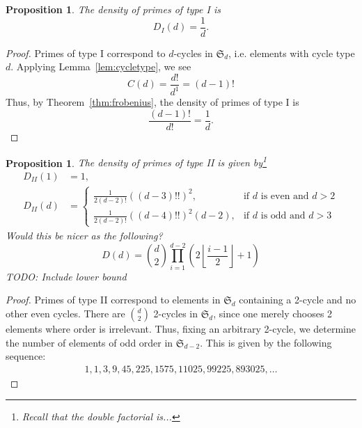 \documentclass[11pt]{article}
\theoremstyle{plain}
\newtheorem{proposition}[theorem]{Proposition}
\theoremstyle{definition}
\theoremstyle{remark}
\numberwithin{equation}{section}
\numberwithin{table}{section}
\renewcommand{\SS}{\mathfrak{S}}
\begin{document}
\begin{proposition}\label{prop:type1}
  The density of primes of type I is 
  \begin{equation*}
    D_I(d)=\frac{1}{d}.
  \end{equation*}
\end{proposition}
\begin{proof}
  Primes of type I correspond to $d$-cycles in $\SS_d$, i.e. elements with 
  cycle type $d$. Applying Lemma~\ref{lem:cycletype}, we see
  \begin{equation*}
    C(d)=\frac{d!}{d^1}=(d-1)!
  \end{equation*}
  Thus, by Theorem~\ref{thm:frobenius}, the density of primes of type I is
  \begin{equation*}
    \frac{(d-1)!}{d!}=\frac{1}{d}.
  \end{equation*}
\end{proof}

\begin{proposition}\label{prop:type2}
  The density of primes of type II is given by\footnote{Recall that the \emph{double factorial} is...}
  \begin{align*}
    D_{II}(1)&=1,\\
    D_{II}(d)&=\begin{cases}
        \frac{1}{2(d-2)!}\left((d-3)!!\right)^2,&\text{if }d\text{ is even and }d>2\\
        \frac{1}{2(d-2)!}\left((d-4)!!\right)^2(d-2),&\text{if }d\text{ is odd and }d>3
    \end{cases}
  \end{align*}
  Would this be nicer as the following?
  \begin{equation*}
    D(d)=\binom{d}{2}\prod_{i=1}^{d-2}\left(2\left\lfloor\frac{i-1}{2}\right\rfloor+1\right)
  \end{equation*}
  TODO: Include lower bound
\end{proposition}
\begin{proof}
  Primes of type II correspond to elements in $\SS_d$ containing a 2-cycle and no other
  even cycles. There are $\binom{d}{2}$ 2-cycles in $\SS_d$, since one merely chooses
  2 elements where order is irrelevant. Thus, fixing an arbitrary 2-cycle, we determine
  the number of elements of odd order in $\SS_{d-2}$. This is given by the following sequence:
  \begin{align*}
    1, 1, 3, 9, 45, 225, 1575, 11025, 99225, 893025, \ldots
  \end{align*}
\end{proof}
\end{document}
